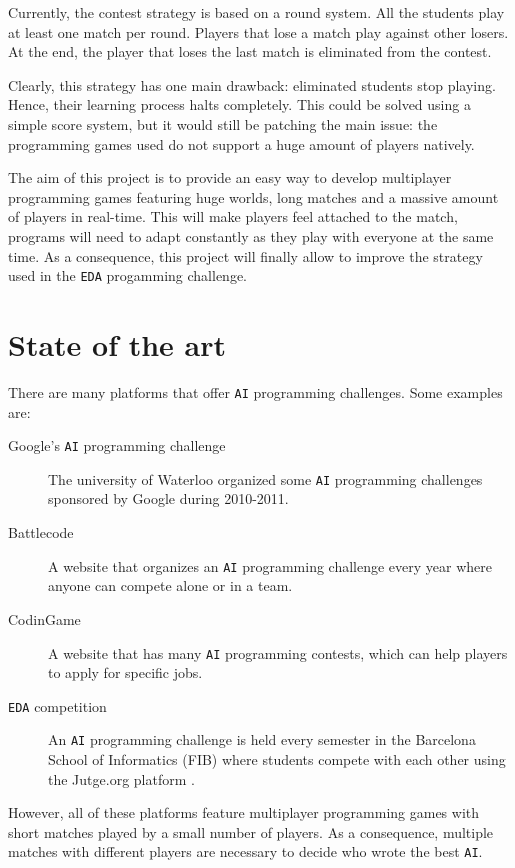 \documentclass[a4paper,11pt,titlepage,abstract,numbers=noenddot,automark,mnsy,intlimits,rgb,dvipsnames]{report}
\begin{document}
Currently, the contest strategy is based on a round system. All the students play at least one match per round. Players
that lose a match play against other losers. At the end, the player that loses the last match is eliminated from the contest.

Clearly, this strategy has one main drawback: eliminated students stop playing. Hence, their learning process halts completely.
This could be solved using a simple score system, but it would still be patching the main issue: the
programming games used do not support a huge amount of players natively.

The aim of this project is to provide an easy way to develop multiplayer programming games featuring huge worlds,
long matches and a massive amount of players in real-time. This will make players feel attached to the match,
programs will need to adapt constantly as they play with everyone at the same time. As a consequence, this project will
finally allow to improve the strategy used in the \texttt{EDA} progamming challenge.
\section{State of the art}
\label{state_of_the_art}
There are many platforms that offer \texttt{AI} programming challenges. Some examples are:
\begin{description}
\item[Google's \texttt{AI} programming challenge \cite{google_ai}]
The university of Waterloo organized some \texttt{AI} programming challenges
  sponsored by Google during 2010-2011.
\item[Battlecode \cite{battlecode}]
A website that organizes an \texttt{AI} programming challenge every year where anyone can
  compete alone or in a team.
\item[CodinGame \cite{codingame}]
A website that has many \texttt{AI} programming contests, which can help players to apply for
  specific jobs.
\item[\texttt{EDA} competition \cite{eda}]
An \texttt{AI} programming challenge is held every semester in the Barcelona School of
  Informatics (FIB) where students compete with each other using the Jutge.org platform \cite{jutge}.
\end{description}
However, all of these platforms feature multiplayer programming games with short matches played by a
small number of players. As a consequence, multiple matches with different players are necessary to decide who wrote
the best \texttt{AI}.
\end{document}
